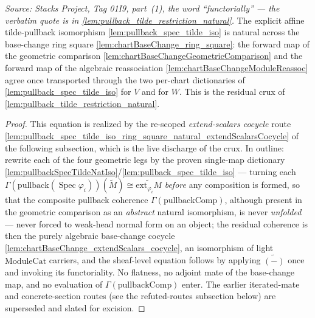 \begin{lemma}
  \label{lem:pullback_spec_tilde_iso_ring_square_natural}
  \textit{Source: Stacks Project, Tag 01I9, part~(1), the word ``functorially''
  --- the verbatim quote is in \cref{lem:pullback_tilde_restriction_natural}.}
  The explicit affine tilde-pullback isomorphism \cref{lem:pullback_spec_tilde_iso} is natural across
  the base-change ring square \cref{lem:chartBaseChange_ring_square}: the forward map of the
  geometric comparison \cref{lem:chartBaseChangeGeometricComparison} and the forward map of the
  algebraic reassociation \cref{lem:chartBaseChangeModuleReassoc} agree once transported through the two
  per-chart dictionaries of \cref{lem:pullback_spec_tilde_iso} for \(V\) and for \(W\). This is the
  residual crux of \cref{lem:pullback_tilde_restriction_natural}.
  \begin{proof}
    This equation is realized by the re-scoped \emph{extend-scalars cocycle} route
    \cref{lem:pullback_spec_tilde_iso_ring_square_natural_extendScalarsCocycle} of the following
    subsection, which is the live discharge of the crux. In outline: rewrite each of the four
    geometric legs by the proven single-map dictionary
    \cref{lem:pullbackSpecTildeNatIso}/\cref{lem:pullback_spec_tilde_iso} — turning each
    \(\Gamma(\mathrm{pullback}(\operatorname{Spec}\varphi_i))(\widetilde M) \cong
    \widetilde{\mathrm{ext}_{\varphi_i} M}\) \emph{before} any composition is formed, so that the
    composite pullback coherence \(\Gamma(\mathrm{pullbackComp})\), although present in the geometric
    comparison as an \emph{abstract} natural isomorphism, is never \emph{unfolded} — never forced to
    weak-head normal form on an object; the
    residual coherence is then the purely algebraic base-change cocycle
    \cref{lem:chartBaseChange_extendScalars_cocycle}, an isomorphism of light \(\mathrm{ModuleCat}\)
    carriers, and the sheaf-level equation follows by applying \(\widetilde{(-)}\) once and invoking its
    functoriality. No flatness, no adjoint mate of the base-change map, and no evaluation of
    \(\Gamma(\mathrm{pullbackComp})\) enter. The earlier iterated-mate and concrete-section routes
    (see the refuted-routes subsection below) are superseded and slated for excision.
  \end{proof}
\end{lemma}

